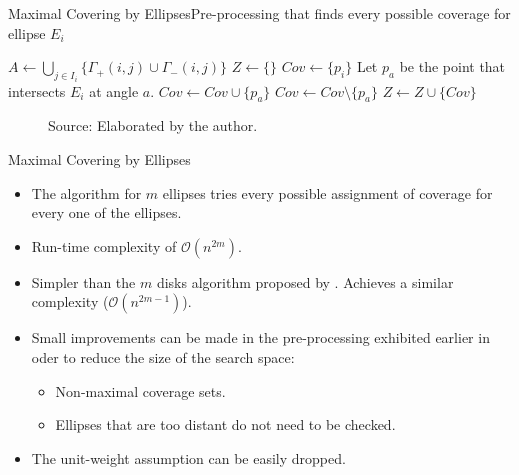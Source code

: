 \documentclass{beamer}
\newcommand{\Pp}{\mathscr{P}}
\newcommand{\bigO}{\mathscr{O}}
\newcommand{\source}[1]{\caption*{Source: {#1}} }
\begin{document}
\begin{frame}[fragile]{Maximal Covering by Ellipses}{Pre-processing that finds every possible coverage for ellipse $E_i$}
	\begin{algorithm}[H]
		\begin{algorithmic}[1]
			\STATE $A \gets \bigcup_{j \in I_i} \{\Gamma_+(i,j) \cup \Gamma_-(i,j)\}$
			\STATE $Z \gets \{\}$
			\STATE $Cov \gets \{p_i\}$
			\STATE Let $p_a$ be the point that intersects $E_i$ at angle $a$. 
			\STATE $Cov \gets Cov \cup \{p_a\}$
			\ELSE
			\STATE $Cov \gets Cov \setminus \{p_a\}$
			\ENDIF
			\STATE $Z \gets Z \cup \{Cov\}$
			\ENDFOR
			\ENDFOR
			
		\end{algorithmic}
	\end{algorithm}
\end{frame}

\begin{frame}
	\begin{figure}
		\caption{Optimal solution with two ellipses for a random instance.}
		
		\source{Elaborated by the author.}
	\end{figure}
\end{frame}

\begin{frame}{Maximal Covering by Ellipses}
	
	\begin{itemize}
		\item The algorithm for $m$ ellipses tries every possible assignment of coverage for every one of the ellipses.
		\item Run-time complexity of $\bigO(n^{2m})$.
		
		\item Simpler than the $m$ disks algorithm proposed by \autocite{cabello:2006}. Achieves a similar complexity ($\bigO(n^{2m-1})$).
		
		\item Small improvements can be made in the pre-processing exhibited earlier in oder to reduce the size of the search space:
		\begin{itemize}
			\item Non-maximal coverage sets.
			\item Ellipses that are too distant do not need to be checked.
		\end{itemize}
	
		\item The unit-weight assumption can be easily dropped.
	\end{itemize}
	
\end{frame}
\end{document}
